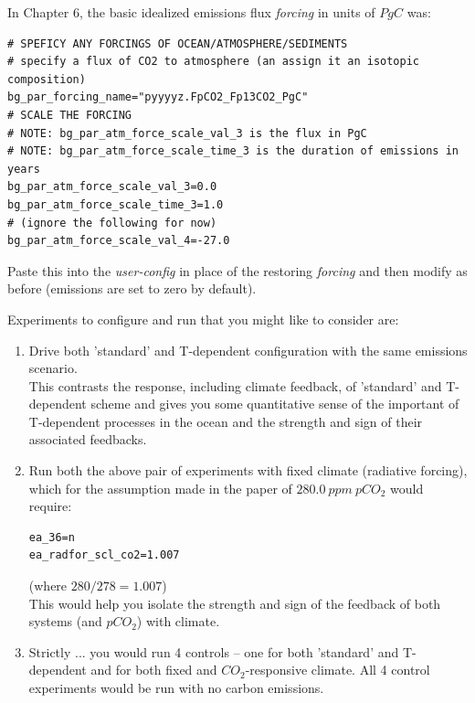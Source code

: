 \vspace{1mm}
In Chapter 6, the basic idealized emissions flux \textit{forcing} in units of $PgC$ was:
\vspace{-2mm}\footnotesize\begin{verbatim}
# SPEFICY ANY FORCINGS OF OCEAN/ATMOSPHERE/SEDIMENTS
# specify a flux of CO2 to atmosphere (an assign it an isotopic composition)
bg_par_forcing_name="pyyyyz.FpCO2_Fp13CO2_PgC"
# SCALE THE FORCING 
# NOTE: bg_par_atm_force_scale_val_3 is the flux in PgC
# NOTE: bg_par_atm_force_scale_time_3 is the duration of emissions in years
bg_par_atm_force_scale_val_3=0.0
bg_par_atm_force_scale_time_3=1.0
# (ignore the following for now)
bg_par_atm_force_scale_val_4=-27.0
\end{verbatim}\normalsize\vspace{-2mm}

Paste this into the \textit{user-config} in place of the restoring \textit{forcing} and then modify as before (emissions are set to zero by default).

\vspace{2mm}
\noindent Experiments to configure and run that you might like to consider are:

\begin{enumerate}[noitemsep]
\vspace{1mm}
\item Drive both 'standard' and T-dependent configuration with the same emissions scenario.
\\This contrasts the response, including climate feedback, of 'standard' and T-dependent scheme and gives you some quantitative sense of the important of T-dependent processes in the ocean and the strength and sign of their associated feedbacks.
\vspace{1mm}
\item Run both the above pair of experiments with fixed climate (radiative forcing), which for the assumption made in the paper of $280.0\:ppm\:pCO_{2}$ would require:
\vspace{-1mm}\small\begin{verbatim}
ea_36=n
ea_radfor_scl_co2=1.007
\end{verbatim}\normalsize\vspace{-1mm}
(where $280/278 = 1.007$)
\\This would help you isolate the strength and sign of the feedback of both systems (and $pCO_{2}$) with climate.
\vspace{1mm}
\item Strictly ... you would run 4 controls -- one for both 'standard' and T-dependent and for both fixed and $CO_{2}$-responsive climate. All 4 control experiments would be run with no carbon emissions.
\end{enumerate}

